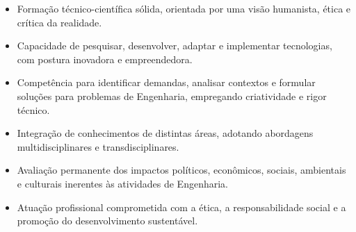 \begin{itemize}
	\item Formação técnico-científica sólida, orientada por uma visão humanista, ética e crítica da realidade.
	\item Capacidade de pesquisar, desenvolver, adaptar e implementar tecnologias, com postura inovadora e empreendedora.
	\item Competência para identificar demandas, analisar contextos e formular soluções para problemas de Engenharia, empregando criatividade e rigor técnico.
	\item Integração de conhecimentos de distintas áreas, adotando abordagens multidisciplinares e transdisciplinares.
	\item Avaliação permanente dos impactos políticos, econômicos, sociais, ambientais e culturais inerentes às atividades de Engenharia.
	\item Atuação profissional comprometida com a ética, a responsabilidade social e a promoção do desenvolvimento sustentável.
\end{itemize}